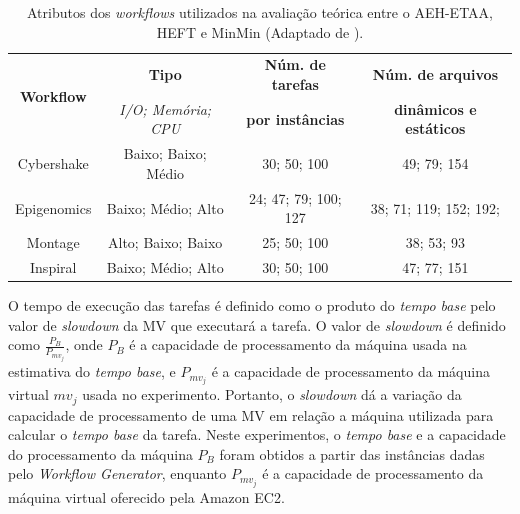 \begin{table}[!ht]
    \begin{center}
        \caption{Atributos dos \textit{workflows} utilizados na avaliação teórica entre o AEH-ETAA, HEFT e MinMin (Adaptado de \cite{Szabo2013}).}
        \label{workflowCharacteristics}
        
         \begin{tabular}{|c |c |c |c |}
            \hline
            \multirow{2}{*}{\textbf{Workflow}} & \multirow{1}{*}{\textbf{Tipo}} & \textbf{Núm. de tarefas} & \textbf{Núm. de arquivos}\\
            & \textit{ I/O; Memória; CPU}    &\textbf{por instâncias}& \textbf{dinâmicos e estáticos}\\
            \hline\hline
    Cybershake  & Baixo; Baixo; Médio     & 30; 50; 100            & 49; 79; 154 \\
	Epigenomics & Baixo; Médio; Alto      & 24; 47; 79; 100; 127   & 38; 71; 119; 152; 192;  \\
	Montage	    & Alto; Baixo; Baixo      & 25; 50; 100            & 38; 53; 93 \\
	Inspiral    & Baixo; Médio; Alto      & 30; 50; 100            & 47; 77; 151  \\
             \hline
         \end{tabular}
    \end{center}
\end{table}





O tempo de execução das tarefas é definido como o produto do \textit{tempo base} pelo valor de \textit{slowdown} da MV que executará a tarefa. O valor de \textit{slowdown} é definido como $\frac{P_B}{P_{mv_{j}}}$, onde $P_B$ é a capacidade de processamento da máquina usada na estimativa do \textit{tempo base}, e $P_{mv_{j}}$ é a capacidade de processamento da máquina virtual $mv_j$ usada no experimento. Portanto, o \textit{slowdown} dá a variação da capacidade de processamento de uma MV em relação a máquina utilizada para calcular o \textit{tempo base} da tarefa. Neste experimentos, o \textit{tempo base} e a capacidade do processamento da máquina $P_B$ foram obtidos a partir das instâncias dadas pelo \textit{Workflow Generator}, enquanto $P_{mv_{j}}$ é a capacidade de processamento da máquina virtual oferecido pela Amazon EC2.

